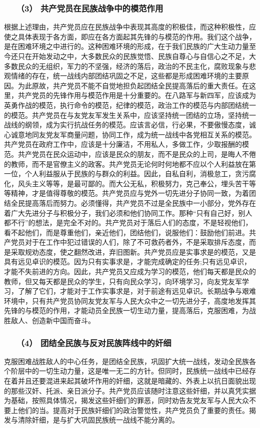 \documentclass[cn,11pt,chinese]{elegantbook}
\def\myformat#1{\hfil\hfil #1}
\begin{document}
\subsubsection*{\myformat{　　（3） 共产党员在民族战争中的模范作用}}
根据上述理由，共产党员应在民族战争中表现其高度的积极佳，而这种积极性，应使之具体表现于各方面，即应在各方面起其先锋的与模范的作用。我们这个战争，是在困难环境之中进行的。这种困难环境的形成，在于我们民族的广大生动力量至今还只在开始发动之中，大多数民众的民族觉悟、民族自尊心与自信心之不足，大多数民众的无组织，军力的不坚强，经济的落后，政治的不民主化，腐败现象与悲观情绪的存在，统一战线内部团结巩固之不足，这些都是形成困难环境的主要原因。为此原故，共产党员不能不自觉地担负起团结全民提高落后的重大责任。在这里，共产党员的先锋作用与模范作用是十分重要的。在八路军与新四军，应该成为英勇作战的模范，执行命令的模范，纪律的模范，政治工作的模范与内部团结统一的模范。共产党员在与友党友军发生关系中，应该坚持统一团结的立场，坚持统一战线的纲领，成为实行抗战任务的模范。应该言必信，行必果，不要傲慢态度，诚心诚意地同友党友军商量问题，协同工作，成为统一战线中各党相互关系的模范。共产党员在政府工作中，应该是十分廉洁，不用私人，多做工作，少取报酬的模范。共产党员在民众运动中，应该是民众的朋友，而不是民众的上司，是晦人不倦的教师，而不是官僚主义的政客。共产党员无论何时何地都不应以个人利益放在第一位，个人利益服从于民族的与群众的利益。因此，自私自利，消极怠工，贪污腐化，风头主义等等，是最可鄙的。而大公无私，积极努力，克己奉公，埋头苦干等等精神，才是值得尊敬的模范。共产党员应与党外一切先进分子协同一致，为着团结全民提高落后而努力。必须懂得，共产党员不过是全民族中一小部分，党外存在着广大先进分子与积极分子，我们必须和他们协同工作。那种“只有自己好，别人都不行”的想法，是完全不对的。共产党员对于落后人们的态度，不是轻视他们，看不起他们，而是尊重他们，亲近他们，团结他们，说服他们：鼓励他们前进。共产党员对于在工作中犯过错误的人们，除了不可救药者外，不是采取排斥态度，而是采取规劝态度，使之翻然改进，弃旧图新。共产党员应是实事求是的模范，又是具有远见卓识的模范。因为只有实事求是，才能完成确定的任务;只有远见卓识，才能不失前进的方向。因此，共产党员又应成为学习的模范，他们每天都是民众的教师，但又每天都是民众的学生，只有向民众学习，向环境学习，向友党友军学习，了解了它们，才能对于工作实事求是，对于前途有远见卓识。长期战争与艰难环境中，只有共产党员协同友党友军与人民大众中之一切先进分子，高度地发挥其先锋的与模范的作用，才能动员全民族一切生动力量，提高落后，克服困难，为战胜敌人、创造新中国而奋斗。\\
\subsubsection*{\myformat{　　（4） 团结全民族与反对民族阵线中的奸细}}
克服困难战胜敌人的中心任务，是团结全民族，巩固扩大统一战线，发动全民族各个阶层中的一切生动力量，这是唯一无二的方针。但同时，民族统一战线中已经存在着并且还要混进来起其破坏作用的奸细，这就是暗藏的、外表上以抗日面貌出现的那些汉奸、托派、亲日派分子。共产党员应该随时注意这些奸细，并以真凭实据为基础，按照具体情况，揭发这些奸细们的罪恶，同时劝告友党友军与人民大众不要上他们的当。提高对于民族奸细们的政治警觉性，共产党员负了重要的责任。揭发与清除奸细，是与扩大巩固民族统一战线不能分离的。\\
\end{document}
